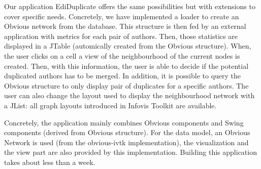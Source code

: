 Our application EdiDuplicate offers the same possibilities but with extensions to cover specific needs. Concretely, we have implemented a loader to create an Obvious network from the  database. This structure is then fed by an external application with metrics for each pair of authors. Then, those statistics are displayed in a JTable (automically created from the Obvious structure). When, the user clicks on a cell a view of the neighbourhood of the current nodes is created. Then, with this information, the user is able to decide if the potential duplicated authors has to be merged. In addition, it is possible to query the Obvious structure to only display pair of duplicates for a specific authors. The user can also change the layout used to display the neighbourhood network with a JList: all graph layouts introduced in Infovis Toolkit are available. 

Concretely, the application mainly combines Obvious components and Swing components (derived from Obvious structure). For the data model, an Obvious Network is used (from the obvious-ivtk implementation), the visualization and the view part are also provided by this implementation. Building this application takes about less than a week.
